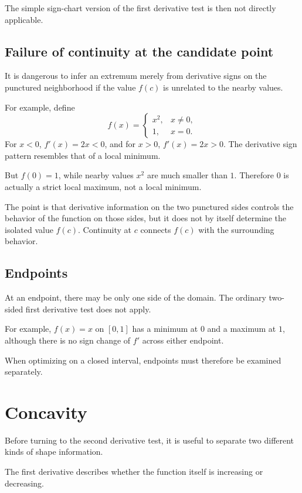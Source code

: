 \documentclass{essay}
\begin{document}
The simple sign-chart version of the first derivative test is then not directly applicable.

\subsection{Failure of continuity at the candidate point}

It is dangerous to infer an extremum merely from derivative signs on the punctured neighborhood if the value \(f(c)\) is unrelated to the nearby values.

For example, define
\[
f(x)=
\begin{cases}
x^2, & x\neq0,\\
1, & x=0.
\end{cases}
\]
For \(x<0\), \(f'(x)=2x<0\), and for \(x>0\), \(f'(x)=2x>0\).
The derivative sign pattern resembles that of a local minimum.

But \(f(0)=1\), while nearby values \(x^2\) are much smaller than \(1\). Therefore \(0\) is actually a strict local maximum, not a local minimum.

The point is that derivative information on the two punctured sides controls the behavior of the function on those sides, but it does not by itself determine the isolated value \(f(c)\). Continuity at \(c\) connects \(f(c)\) with the surrounding behavior.

\subsection{Endpoints}

At an endpoint, there may be only one side of the domain. The ordinary two-sided first derivative test does not apply.

For example, \(f(x)=x\) on \([0,1]\) has a minimum at \(0\) and a maximum at \(1\), although there is no sign change of \(f'\) across either endpoint.

When optimizing on a closed interval, endpoints must therefore be examined separately.

\section{Concavity}

Before turning to the second derivative test, it is useful to separate two different kinds of shape information.

The first derivative describes whether the function itself is increasing or decreasing.
\end{document}
